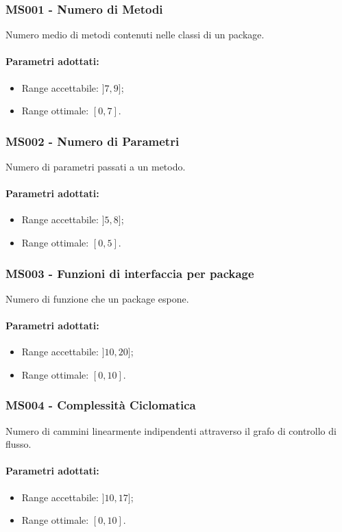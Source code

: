 \subsubsection{MS001 - Numero di Metodi}\mbox{}
Numero medio di metodi contenuti nelle classi di un package. 
\paragraph{Parametri adottati:}
\begin{itemize}
	\item Range accettabile: $ ]7,9]$;
	\item Range ottimale: $[0,7]$.
\end{itemize}

\subsubsection{MS002 - Numero di Parametri}\mbox{}
Numero di parametri passati a un metodo. 
\paragraph{Parametri adottati:}
\begin{itemize}
	\item Range accettabile: $ ]5,8]$;
	\item Range ottimale: $[0,5]$.
\end{itemize}

\subsubsection{MS003 - Funzioni di interfaccia per package}\mbox{}
Numero di funzione che un package espone. 
\paragraph{Parametri adottati:}
\begin{itemize}
	\item Range accettabile: $ ]10,20]$;
	\item Range ottimale: $[0,10]$.
\end{itemize}

\subsubsection{MS004 - Complessità Ciclomatica}\mbox{}
Numero di cammini linearmente indipendenti attraverso il grafo di controllo di flusso. 
\paragraph{Parametri adottati:}
\begin{itemize}
	\item Range accettabile: $ ]10,17]$;
	\item Range ottimale: $[0,10]$.
\end{itemize}

